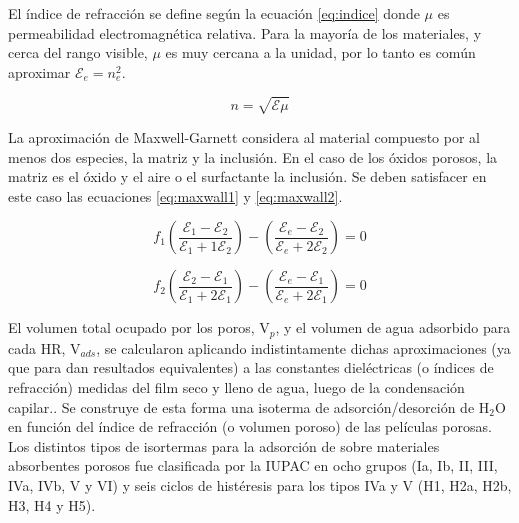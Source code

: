 		El índice de refracción se define según la ecuación \ref{eq:indice} donde $\mu$ es permeabilidad electromagnética relativa. Para la mayoría de los materiales, y cerca del rango visible, $\mu$ es muy cercana a la unidad, por lo tanto es común aproximar $\mathcal{E}_e=n_e^2$.
		
						\begin{equation}
					 	   n=\sqrt{\mathcal{E}\mu}
					 	   \label{eq:indice}
						\end{equation}
		
		La aproximación de Maxwell-Garnett considera al material compuesto por al menos dos especies, la matriz y la inclusión. En el caso de los óxidos porosos, la matriz es el óxido y el aire o el surfactante la inclusión. Se deben satisfacer en este caso las ecuaciones \ref{eq:maxwall1} y \ref{eq:maxwall2}.
				
							\begin{equation}
					 		   	 f_1\left(\frac{\mathcal{E}_1-\mathcal{E}_2}{\mathcal{E}_1+1\mathcal{E}_2}\right)-
					 		   	 \left(\frac{\mathcal{E}_e-\mathcal{E}_2}{\mathcal{E}_e+2\mathcal{E}_2}\right)=0
					 		     \label{eq:maxwall1}
								\end{equation}
						
								\begin{equation}
					 		   	 f_2\left(\frac{\mathcal{E}_2-\mathcal{E}_1}{\mathcal{E}_1+2\mathcal{E}_1}\right)-
					 		   	 \left(\frac{\mathcal{E}_e-\mathcal{E}_1}{\mathcal{E}_e+2\mathcal{E}_1}\right)=0
					 		     \label{eq:maxwall2}
								\end{equation}
		
		El volumen total ocupado por los poros, V$_p$, y el volumen de agua adsorbido para cada HR, V$_{ads}$, se calcularon aplicando indistintamente dichas aproximaciones (ya que para \pdm\space dan resultados equivalentes) a las constantes dieléctricas (o índices de refracción) medidas del film seco y lleno de agua, luego de la condensación capilar.\cite{Angelome2008,Fuertes2009,Nano-compuestas2013}. Se construye de esta forma una isoterma de adsorción/desorción de H$_2$O en función del índice de refracción (o volumen poroso) de las películas porosas. Los distintos tipos de isortermas para la adsorción de sobre materiales absorbentes porosos fue clasificada por la IUPAC en ocho grupos (Ia, Ib, II, III, IVa, IVb, V y VI) y seis ciclos de histéresis para los tipos IVa y V (H1, H2a, H2b, H3, H4 y H5). \cite{Thommes2015}

